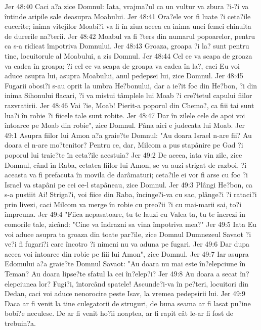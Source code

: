 Jer 48:40  Caci a?a zice Domnul: Iata, vrajma?ul ca un vultur va zbura ?i-?i va întinde aripile sale deasupra Moabului.
Jer 48:41  Ora?ele vor fi luate ?i ceta?ile cucerite; inima vitejilor Moabi?i va fi în ziua aceea ca inima unei femei chinuita de durerile na?terii.
Jer 48:42  Moabul va fi ?ters din numarul popoarelor, pentru ca s-a ridicat împotriva Domnului.
Jer 48:43  Groaza, groapa ?i la? sunt pentru tine, locuitorule al Moabului, a zis Domnul.
Jer 48:44  Cel ce va scapa de groaza va cadea în groapa; ?i cel ce va scapa de groapa va cadea în la?, caci Eu voi aduce asupra lui, asupra Moabului, anul pedepsei lui, zice Domnul.
Jer 48:45  Fugarii obosi?i s-au oprit la umbra He?bonului, dar a ie?it foc din He?bon, ?i din inima Sihonului flacari, ?i va mistui tâmplele lui Moab ?i cre?tetul capului fiilor razvratirii.
Jer 48:46  Vai ?ie, Moab! Pierit-a poporul din Chemo?, ca fiii tai sunt lua?i în robie ?i fiicele tale sunt robite.
Jer 48:47  Dar în zilele cele de apoi voi întoarce pe Moab din robie", zice Domnul. Pâna aici e judecata lui Moab.
Jer 49:1  Asupra fiilor lui Amon a?a graie?te Domnul: "Au doara Israel n-are fii? Au doara el n-are mo?tenitor? Pentru ce, dar, Milcom a pus stapânire pe Gad ?i poporul lui traie?te în ceta?ile acestuia?
Jer 49:2  De aceea, iata vin zile, zice Domnul, când în Raba, cetatea fiilor lui Amon, se va auzi strigat de razboi, ?i aceasta va fi prefacuta în movila de darâmaturi; ceta?ile ei vor fi arse cu foc ?i Israel va stapâni pe cei ce-l stapâneau, zice Domnul.
Jer 49:3  Plângi He?bon, ca s-a pustiit Ai! Striga?i, voi fiice din Raba, încinge?i-va cu sac, plânge?i ?i rataci?i prin livezi, caci Milcom va merge în robie cu preo?ii ?i cu mai-marii sai, to?i împreuna.
Jer 49:4  "Fiica nepasatoare, tu te lauzi cu Valea ta, tu te încrezi în comorile tale, zicând: "Cine va îndrazni sa vina împotriva mea?"
Jer 49:5  Iata Eu voi aduce asupra ta groaza din toate par?ile, zice Domnul Dumnezeul Savaot ?i ve?i fi fugari?i care încotro ?i nimeni nu va aduna pe fugari.
Jer 49:6  Dar dupa aceea voi întoarce din robie pe fiii lui Amon", zice Domnul.
Jer 49:7  Iar asupra Edomului a?a graie?te Domnul Savaot: "Au doara nu mai este în?elepciune în Teman? Au doara lipse?te sfatul la cei în?elep?i?
Jer 49:8  Au doara a secat în?elepciunea lor? Fugi?i, întorcând spatele! Ascunde?i-va în pe?teri, locuitori din Dedan, caci voi aduce nenorocire peste Isav, la vremea pedepsirii lui.
Jer 49:9  Daca ar fi venit la tine culegatorii de struguri, de buna seama ar fi lasat pu?ine bobi?e neculese. De ar fi venit ho?ii noaptea, ar fi rapit cât le-ar fi fost de trebuin?a.
